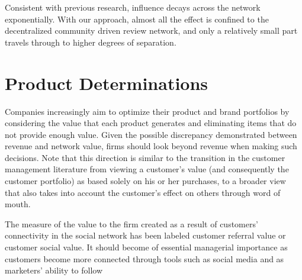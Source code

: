 Consistent with previous research, influence decays across the network exponentially. With our approach, almost all the effect is confined to the decentralized community driven review network, and only a relatively small part travels through to higher degrees of separation.



\section{Product Determinations}

Companies increasingly aim to optimize their product and brand portfolios by considering the value that each product generates and eliminating items that do not provide enough value. Given the possible discrepancy demonstrated between revenue and network value, firms should look beyond revenue when making such decisions. Note that this direction is similar to the transition in the customer management literature from viewing a customer’s value (and consequently the customer portfolio) as based solely on his or her purchases, to a broader view that also takes into account the customer’s effect on others through word of mouth.


The measure of the value to the firm created as a result of customers’ connectivity in the social network has been labeled customer referral value or customer social value. It should become of essential managerial importance as customers become more connected through tools such as social media and as marketers’ ability to follow

